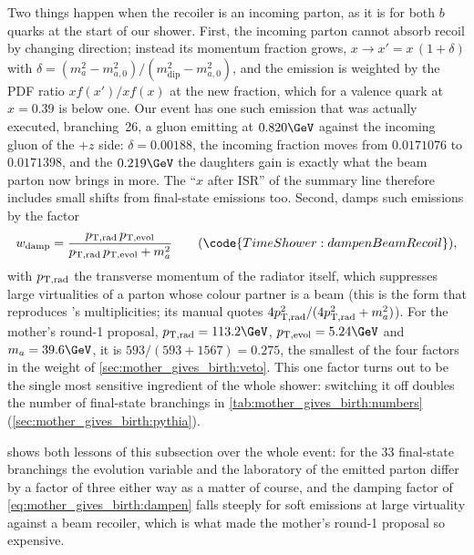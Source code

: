 Two things happen when the recoiler is an incoming parton, as it is for both
$b$ quarks at the start of our shower. First, the incoming parton cannot
absorb recoil by changing direction; instead its momentum fraction grows,
$x\to x'=x\,(1+\delta)$ with $\delta=(m_a^2-m_{a,0}^2)/(m_{\mathrm{dip}}^2-m_{a,0}^2)$,
and the emission is weighted by the PDF ratio $xf(x')/xf(x)$ at the new
fraction, which for a valence quark at $x=0.39$ is below one. Our event
has one such emission that was actually executed, branching~26, a gluon
emitting at $0.820\GeV$ against the incoming gluon of the $+z$ side:
$\delta=0.00188$, the incoming fraction moves from $0.0171076$ to
$0.0171398$, and the $0.219\GeV$ the daughters gain is exactly what the
beam parton now brings in more. The ``$x$ after ISR'' of the summary line
therefore includes small shifts from final-state emissions too. Second,
\PYTHIA damps such emissions by the factor
\begin{equation}
  w_{\mathrm{damp}}=\frac{\ptrad\,\ptevol}
  {\ptrad\,\ptevol+m_a^2}
  \qquad(\code{TimeShower:dampenBeamRecoil}),
  \label{eq:mother_gives_birth:dampen}
\end{equation}
with $p_{\mathrm{T,rad}}$ the transverse momentum of the radiator itself,
which suppresses large virtualities of a parton whose colour partner is a
beam (this is the form that reproduces \PYTHIA's multiplicities; its manual
quotes $4p_{\mathrm{T,rad}}^2/(4p_{\mathrm{T,rad}}^2+m_a^2)$). For the mother's round-1 proposal, $\ptrad=113.2\GeV$,
$\ptevol=5.24\GeV$ and $m_a=39.6\GeV$, it is
$593/(593+1567)=0.275$, the smallest of the four factors in the weight of
\cref{sec:mother_gives_birth:veto}. This one factor turns out to be the single most sensitive ingredient
of the whole shower: switching it off doubles the number of final-state
branchings in \cref{tab:mother_gives_birth:numbers}
(\cref{sec:mother_gives_birth:pythia}).

 shows both lessons of this subsection
over the whole event: for the $33$ final-state branchings the evolution
variable and the laboratory \pt of the emitted parton differ by a factor
of three either way as a matter of course, and the damping factor of
\cref{eq:mother_gives_birth:dampen} falls steeply for soft emissions at
large virtuality against a beam recoiler, which is what made the mother's
round-1 proposal so expensive.


